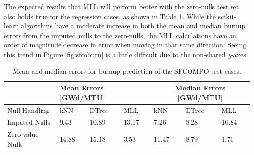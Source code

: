 The expected results that \gls{MLL} will perform better with the zero-nulls
test set also holds true for the regression cases, as shown in Table \ref{tbl:sfcoburn}. 
While the scikit-learn
algorithms have a moderate increase in both the mean and median burnup errors
from the imputed nulls to the zero-nulls, the \gls{MLL} calculations have an
order of magnitude decrease in error when moving in that same direction.
Seeing this trend in Figure \ref{fig:sfcoburn} is a little difficult due to 
the non-shared \textit{y}-axes.

\begin{table}[!htb]
  \centering
  \begin{tabular}{@{}m{1.5in}llllll@{}}
    \toprule
                     & \multicolumn{3}{m{2in}}{Mean Errors [GWd/MTU]} & \multicolumn{3}{c}{Median Errors [GWd/MTU]} \\ \toprule
    Null Handling    & kNN           & DTree         & MLL           & kNN            & DTree          & MLL    \\ \midrule
    Imputed Nulls    & 9.43          & 10.89         & 13.17         & 7.26           & 8.28           & 10.84  \\
    Zero-value Nulls & 14.88         & 15.18         & 3.53          & 11.47          & 8.79           & 1.70   \\ \bottomrule
  \end{tabular}
  \caption{Mean and median errors for burnup prediction of the \gls{SFCOMPO} 
           test cases.}
  \label{tbl:sfcoburn}
\end{table}

